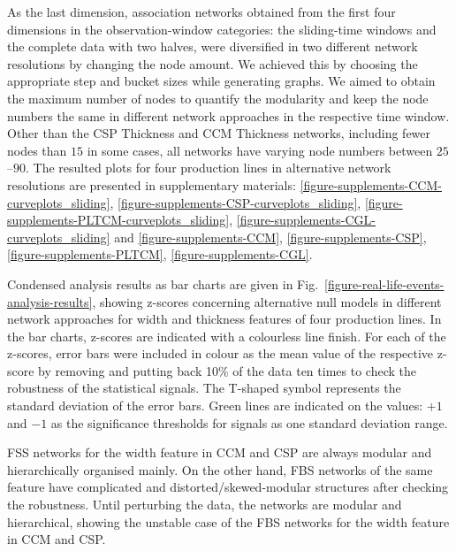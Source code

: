As the last dimension, association networks obtained from the first four dimensions in the observation-window categories: the sliding-time windows and the complete data with two halves, were diversified in two different network resolutions by changing the node amount. We achieved this by choosing the appropriate step and bucket sizes while generating graphs. We aimed to obtain the maximum number of nodes to quantify the modularity and keep the node numbers the same in different network approaches in the respective time window. Other than the CSP Thickness and CCM Thickness networks, including fewer nodes than $15$ in some cases, all networks have varying node numbers between $25$--$90$. The resulted plots for four production lines in alternative network resolutions are presented in supplementary materials: \ref{figure-supplements-CCM-curveplots_sliding}, \ref{figure-supplements-CSP-curveplots_sliding}, \ref{figure-supplements-PLTCM-curveplots_sliding}, \ref{figure-supplements-CGL-curveplots_sliding} and \ref{figure-supplements-CCM}, \ref{figure-supplements-CSP}, \ref{figure-supplements-PLTCM}, \ref{figure-supplements-CGL}.

Condensed analysis results as bar charts are given in Fig.~\ref{figure-real-life-events-analysis-results}, showing z-scores concerning alternative null models in different network approaches for width and thickness features of four production lines. In the bar charts, z-scores are indicated with a colourless line finish. For each of the z-scores, error bars were included in colour as the mean value of the respective z-score by removing and putting back 10\% of the data ten times to check the robustness of the statistical signals. The T-shaped symbol represents the standard deviation of the error bars. Green lines are indicated on the values: $+1$ and $-1$ as the significance thresholds for signals as one standard deviation range.
\renewcommand{\aa}{Analysis Bar Chart Results:}


\newcommand{\bb}{Modularity Values and Z-scores in Different Network Resolutions}
\newcommand{\cc}{Analysis Curve Plot Results:}
\newcommand{\dd}{Modularity Values and Z-scores in Sliding-time Windows \& Different Network Resolutions}
\newcommand{\ee}{Modularity Values and Z-scores in Discrete-time Windows}

FSS networks for the width feature in CCM and CSP are always modular and hierarchically organised mainly. On the other hand, FBS networks of the same feature have complicated and distorted/skewed-modular structures after checking the robustness. Until perturbing the data, the networks are modular and hierarchical, showing the unstable case of the FBS networks for the width feature in CCM and CSP.

